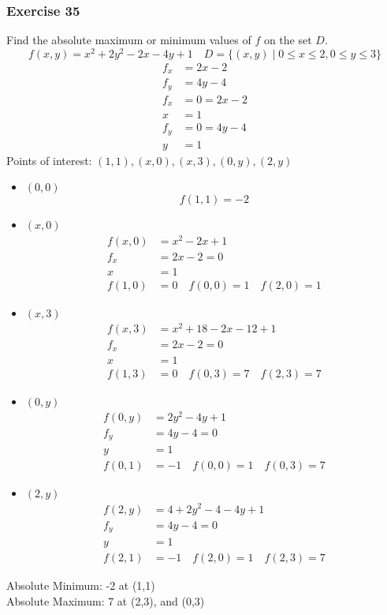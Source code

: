 \documentclass{math}
\begin{document}
\subsubsection*{Exercise 35}
Find the absolute maximum or minimum values of \( f \) on the set \( D \).
\[ f(x,y) = x^2+2y^2-2x-4y+1 \quad D = \{(x,y)\mid0\le x\le2,0\le y\le 3\} \]
\begin{align*}
  f_x &= 2x-2 \\
  f_y &= 4y-4 \\
  f_x &= 0 = 2x-2 \\
  x &= 1 \\
  f_y &= 0 = 4y-4 \\
  y &= 1
\end{align*}
Points of interest: \( (1,1), (x,0), (x,3), (0,y), (2,y) \)
\begin{itemize}
  \item \( (0,0) \)
  \[ f(1,1) = -2 \]
  \item \( (x,0) \)
  \begin{align*}
    f(x,0) &= x^2-2x+1 \\
    f_x &= 2x-2 = 0 \\
    x &= 1 \\
    f(1,0) &= 0 \quad f(0,0) = 1 \quad f(2,0) = 1
  \end{align*}
  \item \( (x,3) \)
  \begin{align*}
    f(x,3) &= x^2+18-2x-12+1 \\
    f_x &= 2x-2 = 0 \\
    x &= 1 \\
    f(1,3) &= 0 \quad f(0,3) = 7 \quad f(2,3) = 7
  \end{align*}
  \item \( (0,y) \)
  \begin{align*}
    f(0,y) &= 2y^2-4y+1 \\
    f_y &= 4y-4 = 0 \\
    y &= 1 \\
    f(0,1) &= -1 \quad f(0,0) = 1 \quad f(0,3) = 7
  \end{align*}
  \item \( (2,y) \)
  \begin{align*}
    f(2,y) &= 4+2y^2-4-4y+1 \\
    f_y &= 4y-4 = 0 \\
    y &= 1 \\
    f(2,1) &= -1 \quad f(2,0) = 1 \quad f(2,3) = 7
  \end{align*}
\end{itemize}
Absolute Minimum: -2 at (1,1) \\
Absolute Maximum: 7 at (2,3), and (0,3)
\end{document}

